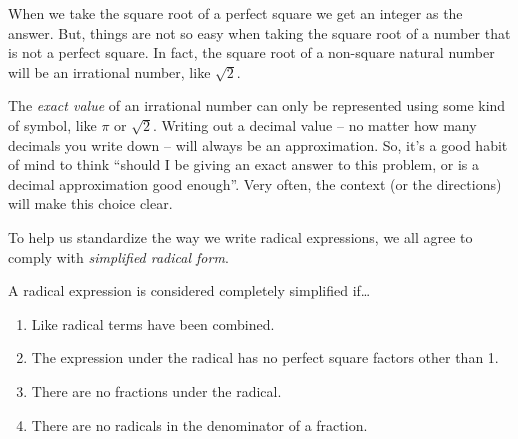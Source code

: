 

When we take the square root of a perfect square we get an integer as the answer. But, things are not so easy when taking the square root of a number that is not a perfect square. In fact, the square root of a non-square natural number will be an irrational number, like $\sqrt{2}$.

The \textit{exact value} of an irrational number can only be represented using some kind of symbol, like $\pi$ or $\sqrt2$. Writing out a decimal value -- no matter how many decimals you write down -- will always be an approximation. So, it's a good habit of mind to think ``should I be giving an exact answer to this problem, or is a decimal approximation good enough''. Very often, the context (or the directions) will make this choice clear.

To help us standardize the way we write radical expressions, we all agree to comply with \textit{simplified radical form}.

\begin{boxedcriteria}
A radical expression is considered completely simplified if\ldots
\begin{enumerate}
\item Like radical terms have been combined.
\item The expression under the radical has no perfect square factors other than 1.
\item There are no fractions under the radical.
\item There are no radicals in the denominator of a fraction.
\end{enumerate}
\end{boxedcriteria}

